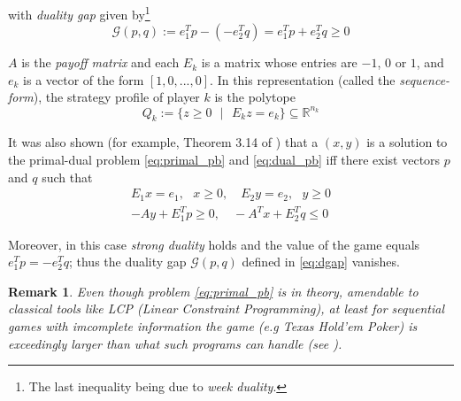 \documentclass{article} %
\newtheorem{remark}{Remark}
\begin{document}
with \textit{duality gap} given by\footnote{The last inequality being due to \textit{week duality}.}
\begin{equation}
  \mathcal{G}(p, q) := e_1^Tp - (-e_2^Tq) = e_1^Tp + e_2^Tq \geq 0
  \label{eq:dgap}
\end{equation}

$A$ is the \textit{payoff matrix} and each $E_k$ is a matrix whose entries are $-1$, $0$ or $1$, and $e_k$ is a vector of the form $[1, 0, ..., 0]$. In this representation (called the \textit{sequence-form}), the strategy profile of player $k$ is the polytope
\begin{equation}
  Q_k := \{z \ge 0\text{ }|\text{ }E_kz = e_k\} \subseteq \mathbb{R}^{n_k}
\label{eq:polytope}
\end{equation}

It was also shown (for example, Theorem 3.14 of \cite{vonequilibrium}) that a $(x, y)$ is a solution to the primal-dual problem \eqref{eq:primal_pb} and \eqref{eq:dual_pb} iff there exist vectors $p$ and $q$ such that
\begin{equation}
  \begin{split}
    E_1x = e_1,\text{ }x \geq 0,\hspace{1em} E_2y = e_2,\text{ }y \geq 0\\
    -Ay + E_1^Tp \geq 0,\hspace{1em}-A^Tx + E_2^Tq \leq 0
    \end{split}
\end{equation}

Moreover, in this case \textit{strong duality} holds and the value of the game equals $e_1^Tp = -e_2^Tq$; thus the duality gap $\mathcal{G}(p, q)$ defined in \eqref{eq:dgap} vanishes.


\begin{remark}  
  Even though problem \eqref{eq:primal_pb} is in theory, amendable to classical tools like LCP (\textit{Linear Constraint Programming}), at least for sequential games with imcomplete information the game (e.g Texas Hold'em Poker) is exceedingly larger than what such programs can handle (see \cite{hoda2010smoothing}).
\end{remark}
\end{document}
